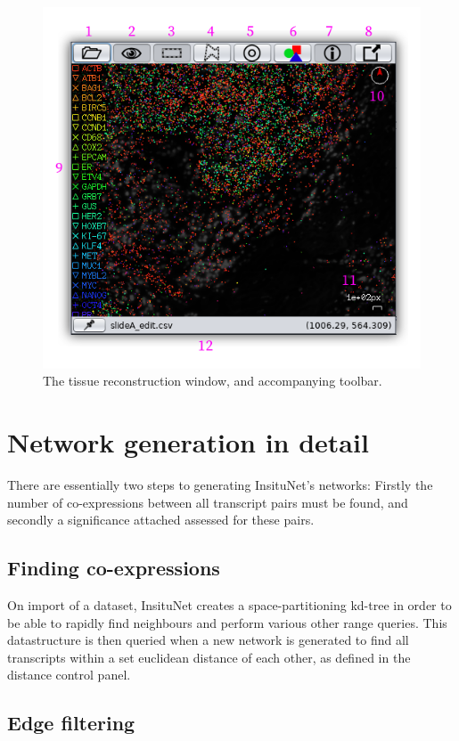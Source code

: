 \documentclass[a4paper,12pt]{article}
\begin{document}
\begin{figure}[htb]
	\caption{The tissue reconstruction window, and accompanying toolbar.}\label{fig:recon_details}
	\centering
	\includegraphics[width=\textwidth]{recon_details-shadow}
\end{figure}

\section{Network generation in detail}
There are essentially two steps to generating InsituNet's networks: Firstly the number of co-expressions between all transcript pairs must be found, and secondly a significance attached assessed for these pairs.

\subsection{Finding co-expressions}
On import of a dataset, InsituNet creates a space-partitioning kd-tree in order to be able to rapidly find neighbours and perform various other range queries. This datastructure is then queried when a new network is generated to find all transcripts within a set euclidean distance of each other, as defined in the distance control panel.

\subsection{Edge filtering}
\end{document}
